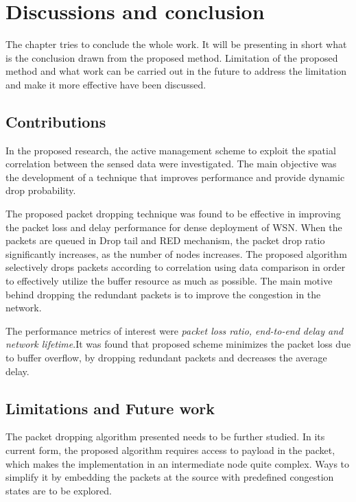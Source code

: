 \chapter{Discussions and conclusion}
The chapter tries to conclude the whole work. It will be presenting in short what is the conclusion drawn from the proposed method. Limitation of the proposed method and what work can be carried out in the future to address the limitation and make it more effective have been discussed.
\section{Contributions}
In the proposed research, the active management scheme to exploit the spatial correlation between the sensed data were investigated. The main objective was the development of a technique that improves performance and provide dynamic drop probability. 
\par
The proposed packet dropping technique was found to be effective in improving the packet loss and delay performance for dense deployment of WSN.    When the packets are queued in Drop tail and RED mechanism, the packet drop ratio significantly increases, as the number of nodes increases. The proposed algorithm selectively drops packets according to correlation using data comparison in order to effectively utilize the buffer resource as much as possible. The main motive behind dropping the redundant packets is to improve the congestion in the network. 
\par The performance metrics of interest were \textit{packet loss ratio, end-to-end delay and network lifetime}.It was found that proposed scheme minimizes the packet loss due to buffer overflow, by dropping redundant packets and decreases the average delay.
\section{Limitations and Future work}
The packet dropping algorithm presented needs to be further studied. In its current form, the proposed algorithm requires access to payload in the packet, which makes the implementation in an intermediate node quite complex. Ways to simplify it by embedding the packets at the source with predefined congestion states are to be explored.